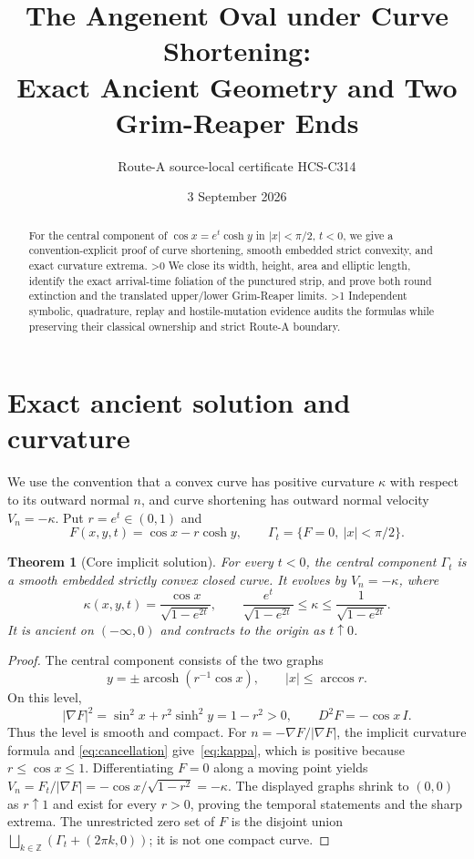 \documentclass[10pt]{article}
\title{The Angenent Oval under Curve Shortening:\\
Exact Ancient Geometry and Two Grim-Reaper Ends}
\author{Route-A source-local certificate HCS-C314}
\date{3 September 2026}
\providecommand{\CRevisionRound}{2}
\newtheorem{theorem}{Theorem}
\newcommand{\arcosh}{\operatorname{arcosh}}
\begin{document}
\maketitle
\begin{abstract}
For the central component of $\cos x=e^t\cosh y$ in $|x|<\pi/2$, $t<0$, we give a
convention-explicit proof of curve shortening, smooth embedded strict
convexity, and exact curvature extrema.
\ifnum\CRevisionRound>0
We close its width, height, area and elliptic length, identify the exact
arrival-time foliation of the punctured strip, and prove both round
extinction and the translated upper/lower Grim-Reaper limits.
\fi
\ifnum\CRevisionRound>1
Independent symbolic, quadrature, replay and hostile-mutation evidence
audits the formulas while preserving their classical ownership and strict
Route-A boundary.
\fi
\end{abstract}

\section{Exact ancient solution and curvature}
We use the convention that a convex curve has positive curvature $\kappa$
with respect to its outward normal $n$, and curve shortening has outward
normal velocity $V_n=-\kappa$.  Put $r=e^t\in(0,1)$ and
\[
 F(x,y,t)=\cos x-r\cosh y,\qquad
 \Gamma_t=\{F=0,\ |x|<\pi/2\}.
\]
\begin{theorem}[Core implicit solution]\label{thm:core}
For every $t<0$, the central component $\Gamma_t$ is a smooth embedded strictly convex closed
curve.  It evolves by $V_n=-\kappa$, where
\begin{equation}\label{eq:kappa}
 \kappa(x,y,t)=\frac{\cos x}{\sqrt{1-e^{2t}}},\qquad
 \frac{e^t}{\sqrt{1-e^{2t}}}\leq\kappa\leq
 \frac1{\sqrt{1-e^{2t}}}.
\end{equation}
It is ancient on $(-\infty,0)$ and contracts to the origin as $t\uparrow0$.
\end{theorem}
\begin{proof}
The central component consists of the two graphs
\[
 y=\pm\arcosh(r^{-1}\cos x),\qquad |x|\leq\arccos r.
\]
On this level,
\begin{equation}\label{eq:cancellation}
 |\nabla F|^2=\sin^2x+r^2\sinh^2y=1-r^2>0,
 \qquad D^2F=-\cos x\,I.
\end{equation}
Thus the level is smooth and compact.  For
$n=-\nabla F/|\nabla F|$, the implicit curvature formula and
\eqref{eq:cancellation} give~\eqref{eq:kappa}, which is positive because
$r\leq\cos x\leq1$.  Differentiating $F=0$ along a moving point yields
$V_n=F_t/|\nabla F|=-\cos x/\sqrt{1-r^2}=-\kappa$.
The displayed graphs shrink to $(0,0)$ as $r\uparrow1$ and exist for every
$r>0$, proving the temporal statements and the sharp extrema.
The unrestricted zero set of $F$ is the disjoint union
$\bigsqcup_{k\in\mathbb Z}(\Gamma_t+(2\pi k,0))$; it is not one compact
curve.
\end{proof}
\end{document}
